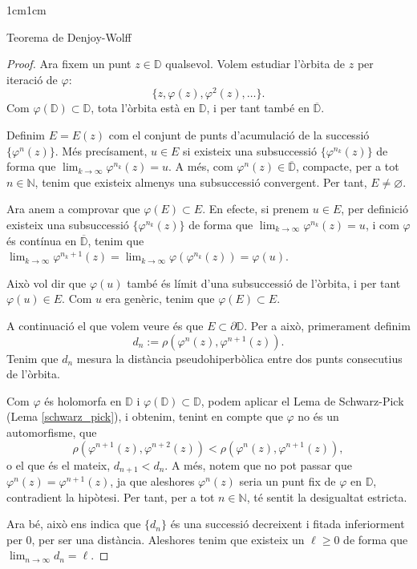 \begin{adjustwidth}{1cm}{1cm}
\begin{subsection}{Teorema de Denjoy-Wolff}
\begin{proof}
        Ara fixem un punt $z\in \mathbb{D}$ qualsevol. Volem estudiar l'òrbita de $z$ per iteració de $\varphi$: 
        \[
            \{z,\varphi(z), \varphi^2(z),\dots\}.
        \]
        Com $\varphi(\mathbb{D})\subset \mathbb{D}$, tota l'òrbita està en $\mathbb{D}$, i per tant també en $\overline{\mathbb{D}}$.
        
        Definim $E=E(z)$ com el conjunt de punts d'acumulació de la successió $\{\varphi^n(z)\}$. Més precísament, $u\in E$ si existeix una subsuccessió $\{\varphi^{n_k}(z)\}$ de forma que $\displaystyle\lim_{k\to\infty}\varphi^{n_k}(z)=u$. A més, com $\varphi^n(z)\in\overline{\mathbb{D}}$, compacte, per a tot $n\in \mathbb{N}$, tenim que existeix almenys una subsuccessió convergent. Per tant, $E\neq \varnothing$.

        Ara anem a comprovar que $\varphi(E)\subset E$. En efecte, si prenem $u\in E$, per definició existeix una subsuccessió $\{\varphi^{n_k}(z)\}$ de forma que $\displaystyle\lim_{k\to\infty}\varphi^{n_k}(z)=u$, i com $\varphi$ és contínua en $\overline{\mathbb{D}}$, tenim que $\displaystyle\lim_{k\to\infty}\varphi^{n_k+1}(z)=\displaystyle\lim_{k\to\infty}\varphi(\varphi^{n_k}(z))=\varphi(u)$.

        Això vol dir que $\varphi(u)$ també és límit d'una subsuccessió de l'òrbita, i per tant $\varphi(u)\in E$. Com $u$ era genèric, tenim que $\varphi(E)\subset E$.

        A continuació el que volem veure és que $E\subset \partial \mathbb{D}$. Per a això, primerament definim
        \[
            d_n:=\rho(\varphi^n(z),\varphi^{n+1}(z)).
        \]
        Tenim que $d_n$ mesura la distància pseudohiperbòlica entre dos punts consecutius de l'òrbita.

        Com $\varphi$ és holomorfa en $\mathbb{D}$ i $\varphi(\mathbb{D})\subset \mathbb{D}$, podem aplicar el Lema de Schwarz-Pick (Lema \ref{schwarz_pick}), i obtenim, tenint en compte que $\varphi$ no és un automorfisme, que
        \[
            \rho(\varphi^{n+1}(z),\varphi^{n+2}(z))<\rho(\varphi^n(z),\varphi^{n+1}(z)),
        \]
        o el que és el mateix, $d_{n+1}<d_n$. A més, notem que no pot passar que $\varphi^n(z)=\varphi^{n+1}(z)$, ja que aleshores $\varphi^n(z)$ seria un punt fix de $\varphi$ en $\mathbb{D}$, contradient la hipòtesi. Per tant, per a tot $n\in \mathbb{N}$, té sentit la desigualtat estricta.

        Ara bé, això ens indica que $\{d_n\}$ és una successió decreixent i fitada inferiorment per $0$, per ser una distància. Aleshores tenim que existeix un $\ell\geq 0$ de forma que $\displaystyle\lim_{n\to\infty}d_n=\ell$.


\end{proof}
\end{subsection}
\end{adjustwidth}

